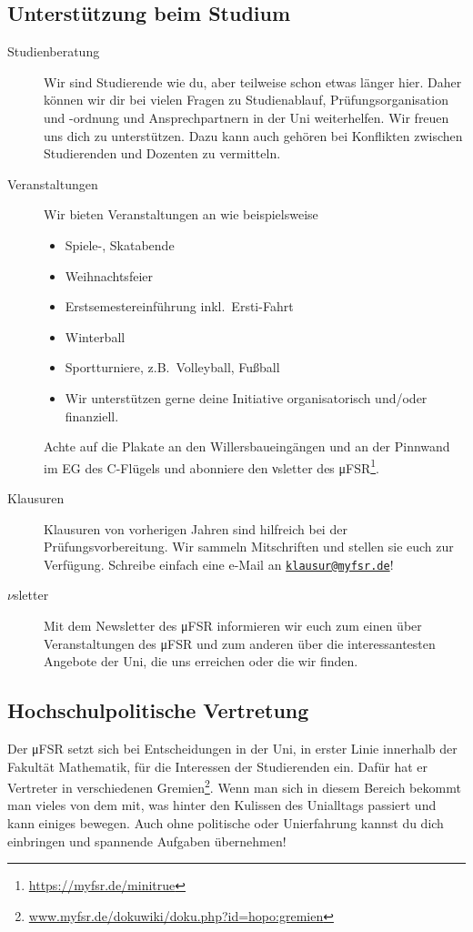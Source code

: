 \documentclass{scrartcl}
\begin{document}
\subsection*{Unterstützung beim Studium}
\label{sub:unterstutzung_beim_studium}
\begin{description}
  \item[Studienberatung] Wir sind Studierende wie du, aber teilweise schon etwas länger hier.
    Daher können wir dir bei vielen Fragen zu Studienablauf, Prüfungsorganisation und -ordnung und Ansprechpartnern in der Uni weiterhelfen.
    Wir freuen uns dich zu unterstützen.
    Dazu kann auch gehören bei Konflikten zwischen Studierenden und Dozenten zu vermitteln.
  \item[Veranstaltungen] Wir bieten Veranstaltungen an wie beispielsweise
    \begin{itemize}
      \item Spiele-, Skatabende
      \item Weihnachtsfeier
      \item Erstsemestereinführung inkl.\ Ersti-Fahrt
      \item Winterball
      \item Sportturniere, z.B.\ Volleyball, Fußball
      \item Wir unterstützen gerne deine Initiative organisatorisch und/oder finanziell.
    \end{itemize}
    Achte auf die Plakate an den Willersbaueingängen und an der Pinnwand im EG des C-Flügels und
    abonniere den νsletter des μFSR\footnote{\url{https://myfsr.de/minitrue}}.
  \item[Klausuren] Klausuren von vorherigen Jahren sind hilfreich bei der Prüfungsvorbereitung.
    Wir sammeln Mitschriften und stellen sie euch zur Verfügung.
    Schreibe einfach eine e-Mail an \href{mailto:klausur@myfsr.de}{\nolinkurl{klausur@myfsr.de}}!
  \item[$\nu$sletter] Mit dem Newsletter des μFSR informieren wir euch zum einen über
    Veranstaltungen des μFSR und zum anderen über die interessantesten Angebote der Uni,
    die uns erreichen oder die wir finden.
\end{description}

\subsection*{Hochschulpolitische Vertretung}
\label{sub:hochschulpolitische_vertretung}
Der μFSR setzt sich bei Entscheidungen in der Uni, in erster Linie innerhalb der Fakultät Mathematik,
für die Interessen der Studierenden ein.
Dafür hat er Vertreter in verschiedenen Gremien\footnote{\url{www.myfsr.de/dokuwiki/doku.php?id=hopo:gremien}}.
Wenn man sich in diesem Bereich  bekommt man vieles von dem mit, was hinter den Kulissen
des Unialltags passiert und kann einiges bewegen.
Auch ohne politische oder Unierfahrung kannst du dich einbringen und spannende Aufgaben übernehmen!
\end{document}
